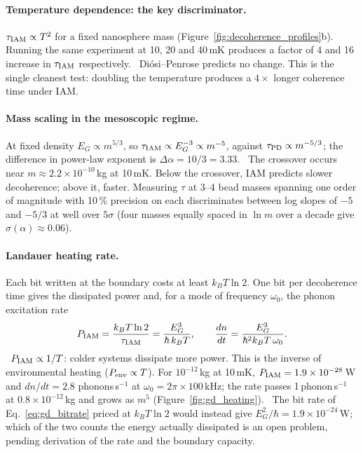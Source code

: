 \paragraph{Temperature dependence: the key discriminator.} $\tau_{\rm IAM}\propto T^2$ for a fixed nanosphere mass (Figure~\ref{fig:decoherence_profiles}b).
Running the same experiment at 10, 20 and 40\,mK produces a factor of 4 and 16 increase in $\tau_{\rm IAM}$ respectively. \calc\ Di\'osi--Penrose predicts
no change. This is the single cleanest test: doubling the temperature produces a $4\times$ longer coherence time under IAM.

\paragraph{Mass scaling in the mesoscopic regime.} At fixed density $E_G\propto m^{5/3}$, so $\tau_{\rm IAM}\propto E_G^{-3}\propto m^{-5}$, against
$\tau_{\rm PD}\propto m^{-5/3}$; the difference in power-law exponent is $\Delta\alpha=10/3=3.33$. \calc\ The crossover occurs near $m\approx2.2\times10^{-10}$\,kg
at 10\,mK. Below the crossover, IAM predicts slower decoherence; above it, faster. Measuring $\tau$ at 3--4 bead masses spanning one order of magnitude with
10\,\% precision on each discriminates between log slopes of $-5$ and $-5/3$ at well over $5\sigma$ (four masses equally spaced in $\ln m$ over a decade give
$\sigma(\alpha)\approx0.06$). \calc

\paragraph{Landauer heating rate.} Each bit written at the boundary costs at least $k_BT\ln2$. One bit per decoherence time gives the dissipated power and,
for a mode of frequency $\omega_0$, the phonon excitation rate
\begin{equation}
P_{\rm IAM}=\frac{k_BT\ln2}{\tau_{\rm IAM}}=\frac{E_G^3}{\hbar\,k_BT},\qquad\frac{dn}{dt}=\frac{E_G^3}{\hbar^2k_BT\,\omega_0}.\label{eq:gd_heating}
\end{equation}
\calc\ $P_{\rm IAM}\propto1/T$: colder systems dissipate more power. This is the inverse of environmental heating ($P_{\rm env}\propto T$). For
$10^{-12}$\,kg at 10\,mK, $P_{\rm IAM}=1.9\times10^{-28}$\,W and $dn/dt=2.8$ phonons\,s$^{-1}$ at $\omega_0=2\pi\times100$\,kHz; the rate passes
1\,phonon\,s$^{-1}$ at $0.8\times10^{-12}$\,kg and grows as $m^5$ (Figure~\ref{fig:gd_heating}). \calc\ The bit rate of Eq.~\eqref{eq:gd_bitrate} priced at
$k_BT\ln2$ would instead give $E_G^2/\hbar=1.9\times10^{-24}$\,W; which of the two counts the energy actually dissipated is an open problem, pending derivation of the rate and the boundary capacity. \openprob

